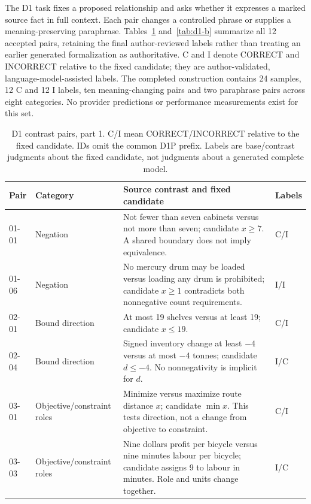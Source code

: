 The D1 task fixes a proposed relationship and asks whether it expresses a marked source fact in full context. Each pair changes a controlled phrase or supplies a meaning-preserving paraphrase. Tables~\ref{tab:d1-a} and~\ref{tab:d1-b} summarize all 12 accepted pairs, retaining the final author-reviewed labels rather than treating an earlier generated formalization as authoritative. C and I denote CORRECT and INCORRECT relative to the fixed candidate; they are author-validated, language-model-assisted labels. The completed construction contains 24 samples, 12 C and 12 I labels, ten meaning-changing pairs and two paraphrase pairs across eight categories. No provider predictions or performance measurements exist for this set.

\begin{table}[htbp]\centering\small
\caption{D1 contrast pairs, part 1. C/I mean CORRECT/INCORRECT relative to the fixed candidate. IDs omit the common D1P prefix. Labels are base/contrast judgments about the fixed candidate, not judgments about a generated complete model.}\label{tab:d1-a}
\renewcommand{\arraystretch}{1.18}
\begin{tabularx}{\linewidth}{@{}l>{\raggedright\arraybackslash}p{2.3cm}Xl@{}}\toprule
Pair & Category & Source contrast and fixed candidate & Labels\\\midrule
01-01 & Negation & Not fewer than seven cabinets versus not more than seven; candidate $x\geq7$. A shared boundary does not imply equivalence. & C/I\\[3pt]
01-06 & Negation & No mercury drum may be loaded versus loading any drum is prohibited; candidate $x\geq1$ contradicts both nonnegative count requirements. & I/I\\[3pt]
02-01 & Bound direction & At most 19 shelves versus at least 19; candidate $x\leq19$. & C/I\\[3pt]
02-04 & Bound direction & Signed inventory change at least $-4$ versus at most $-4$ tonnes; candidate $d\leq-4$. No nonnegativity is implicit for $d$. & I/C\\[3pt]
03-01 & Objective/\allowbreak constraint roles & Minimize versus maximize route distance $x$; candidate $\min x$. This tests direction, not a change from objective to constraint. & C/I\\[3pt]
03-03 & Objective/\allowbreak constraint roles & Nine dollars profit per bicycle versus nine minutes labour per bicycle; candidate assigns 9 to labour in minutes. Role and units change together. & I/C\\\bottomrule
\end{tabularx}\end{table}

